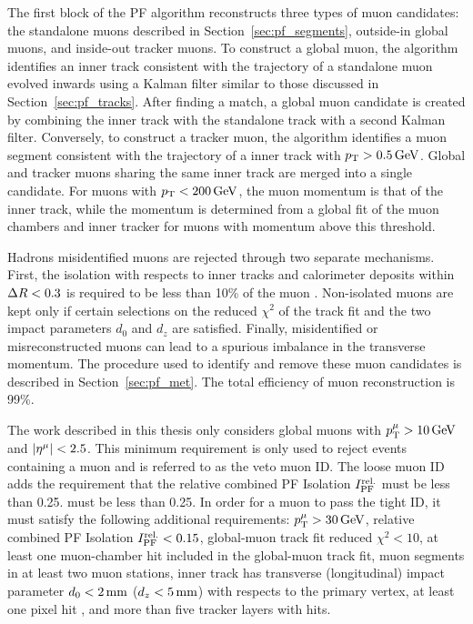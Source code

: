 The first block of the PF algorithm reconstructs three types of muon candidates: the standalone muons described in Section~\ref{sec:pf_segments}, outside-in global muons, and inside-out tracker muons.
To construct a global muon, the algorithm identifies an inner track consistent with the trajectory of a standalone muon evolved inwards using a Kalman filter similar to those discussed in Section~\ref{sec:pf_tracks}. 
After finding a match, a global muon candidate is created by combining the inner track with the standalone track with a second Kalman filter. 
Conversely, to construct a tracker muon, the algorithm identifies a muon segment consistent with the trajectory of a inner track with $p_{\mathrm{T}} > 0.5\,\text{Ge\hspace{-.08em}V}$.
Global and tracker muons sharing the same inner track are merged into a single candidate.
For muons with $p_{\mathrm{T}} < 200\,\text{Ge\hspace{-.08em}V}$, the muon momentum is that of the inner track, while the momentum is determined from a global fit of the muon chambers and inner tracker for muons with momentum above this threshold. 

Hadrons misidentified muons are rejected through two separate mechanisms. First, the isolation with respects to inner tracks and calorimeter deposits within $\Delta R < 0.3$ is required to be less than 10\% of the muon \pt.
Non-isolated muons are kept only if certain selections on the reduced $\chi^2$ of the track fit and the two impact parameters $d_0$ and $d_z$ are satisfied.
Finally, misidentified or misreconstructed muons can lead to a spurious imbalance in the transverse momentum.
The procedure used to identify and remove these muon candidates is described in Section~\ref{sec:pf_met}.
The total efficiency of muon reconstruction is 99\%.

The work described in this thesis only considers global muons with $p_{\mathrm{T}}^{{\mu}} > 10\,\text{Ge\hspace{-.08em}V}$ and $\lvert \eta^{{\mu}} \rvert < 2.5$.
This minimum requirement is only used to reject events containing a muon and is referred to as the veto muon ID. 
The loose muon ID adds the requirement that the relative combined PF Isolation $I_{\text{PF}}^{\text{rel.}}$ must be less than 0.25.
 must be less than 0.25.
In order for a muon to pass the tight ID, it must satisfy the following additional requirements:
$p_{\mathrm{T}}^{{\mu}} > 30\,\text{Ge\hspace{-.08em}V}$,
relative combined PF Isolation $I_{\text{PF}}^{\text{rel.}} < 0.15$,
global-muon track fit reduced $\chi^2 < 10$,
at least one muon-chamber hit included in the global-muon track fit,
muon segments in at least two muon stations,
inner track has transverse (longitudinal) impact parameter $d_0 < 2\,\text{mm}$ ($d_z < 5\,\text{mm}$) with respects to the primary vertex,
at least one pixel hit ,
and more than five tracker layers with hits.

